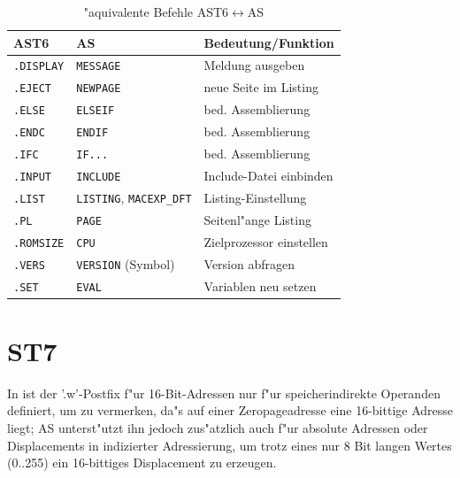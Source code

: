 \documentclass[12pt,a4paper,twoside]{report}
\newcommand{\tty}[1]{{\tt #1}}
\newcommand{\asname}{AS}
\begin{document}
\begin{table}[htbp]
\begin{center}\begin{tabular}{|l|l|l|}
\hline
AST6           &   \asname{}                & Bedeutung/Funktion \\
\hline
\hline
\tty{.DISPLAY} &  \tty{MESSAGE}               & Meldung ausgeben \\
\hline
\tty{.EJECT}   &  \tty{NEWPAGE}               & neue Seite im Listing \\
\hline
\tty{.ELSE}    &  \tty{ELSEIF}                & bed. Assemblierung \\
\hline
\tty{.ENDC}    &  \tty{ENDIF}                 & bed. Assemblierung \\
\hline
\tty{.IFC}     &  \tty{IF...}                 & bed. Assemblierung \\
\hline
\tty{.INPUT}   &  \tty{INCLUDE}               & Include-Datei einbinden \\
\hline
\tty{.LIST}    &  \tty{LISTING}, \tty{MACEXP\_DFT} & Listing-Einstellung \\
\hline
\tty{.PL}      &  \tty{PAGE}                  & Seitenl"ange Listing \\
\hline
\tty{.ROMSIZE} &  \tty{CPU}                   & Zielprozessor einstellen \\
\hline
\tty{.VERS}    &  \tty{VERSION} (Symbol)      & Version abfragen \\
\hline
\tty{.SET}     &  \tty{EVAL}                  & Variablen neu setzen \\
\hline
\end{tabular}\end{center}
\caption{"aquivalente Befehle AST6$\leftrightarrow$\asname{}\label{TabAST6}}
\end{table}


\section{ST7}

In \cite{ST7Man} ist der '.w'-Postfix f"ur 16-Bit-Adressen nur f"ur
speicherindirekte Operanden definiert, um zu vermerken, da"s auf einer
Zeropageadresse eine 16-bittige Adresse liegt; \asname{} unterst"utzt ihn jedoch
zus"atzlich auch f"ur absolute Adressen oder Displacements in indizierter
Adressierung, um trotz eines nur 8 Bit langen Wertes (0..255) ein
16-bittiges Displacement zu erzeugen.
\end{document}
